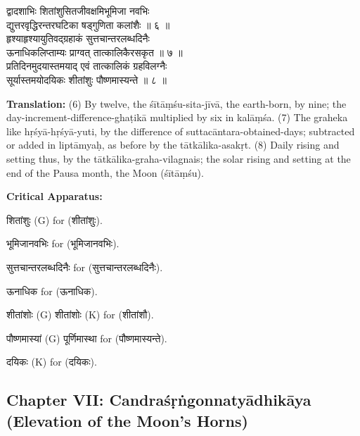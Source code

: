 \documentclass[11pt,a4paper]{article}
\newcommand{\dev}[1]{{\devanagarifont #1}}
\newcommand{\sanskritcol}[1]{%
  \begin{minipage}[t]{0.47\textwidth}
  \vspace{0pt}
  \begin{flushleft}
  #1
  \end{flushleft}
  \end{minipage}%
  \hfill
}
\newcommand{\englishcol}[1]{%
  \begin{minipage}[t]{0.47\textwidth}
  \vspace{0pt}
  \begin{flushleft}
  #1
  \end{flushleft}
  \end{minipage}%
}
\newenvironment{variants}{%
  \small%
  \color{varecolor}%
  \list{}{\leftmargin=2em\itemindent=-1em}%
}{\endlist}
\begin{document}
\noindent
\sanskritcol{\dev{द्वादशाभिः शितांशुसितजीवक्षमिभूमिजा नवभिः} \\ \dev{द्युत्तरवृद्धिरन्तरघटिका षड्गुणिता कलांशैः ॥ ६ ॥} \\[0.2cm]
\dev{हृश्याहृश्यायुतिवद्ग्रहाकं सुत्तचान्तरलब्धदिनैः} \\ \dev{ऊनाधिकलिप्ताम्यः प्राग्वत् तात्कालिकैरसकृत ॥ ७ ॥} \\[0.2cm]
\dev{प्रतिदिनमुदयास्तमयाद् एवं तात्कालिकं ग्रहविलग्नैः} \\ \dev{सूर्यास्तमयोदयिकः शीतांशुः पौष्णमास्यन्ते ॥ ८ ॥}}
\englishcol{\textbf{Translation:} (6) By twelve, the śītāṃśu-sita-jīvā, the earth-born, by
nine; the day-increment-difference-ghaṭikā multiplied by six in kalāṃśa. (7) The
graheka like hṛśyā-hṛśyā-yuti, by the difference of suttacāntara-obtained-days;
subtracted or added in liptāmyaḥ, as before by the tātkālika-asakṛt. (8) Daily
rising and setting thus, by the tātkālika-graha-vilagnais; the solar rising and
setting at the end of the Pausa month, the Moon (śītāṃśu).}

\vspace{0.4cm}
\textcolor{varecolor}{\textbf{Critical Apparatus:}}
\begin{variants}
\item[6.1] \dev{शितांशुः} (G) \dev{for} (\dev{शीतांशुः}).
\item[6.2] \dev{भूमिजानवभिः} \dev{for} (\dev{भूमिजानवभिः}).
\item[7.1] \dev{सुत्तचान्तरलब्धदिनैः} \dev{for} (\dev{सुत्तचान्तरलब्धदिनैः}).
\item[7.2] \dev{ऊनाधिक} \dev{for} (\dev{ऊनाधिक}).
\item[8.1] \dev{शीतांशोः} (G) \dev{शीतांशोः} (K) \dev{for} (\dev{शीतांशौ}).
\item[8.2] \dev{पौष्णमास्यां} (G) \dev{पूर्णिमास्था} \dev{for} (\dev{पौष्णमास्यन्ते}).
\item[8.3] \dev{दयिकः} (K) \dev{for} (\dev{दयिकः}).
\end{variants}

\subsection*{Chapter VII: Candraśṛṅgonnatyādhikāya (Elevation of the Moon's Horns)}
\end{document}
